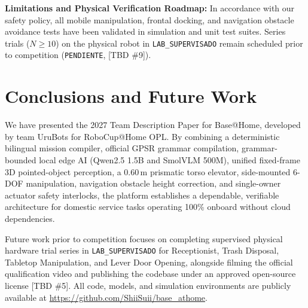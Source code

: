 \documentclass[runningheads,a4paper]{llncs}
\begin{document}
\textbf{Limitations and Physical Verification Roadmap:} In accordance with our safety policy, all mobile manipulation, frontal docking, and navigation obstacle avoidance tests have been validated in simulation and unit test suites. Series trials ($N \ge 10$) on the physical robot in \texttt{LAB\_SUPERVISADO} remain scheduled prior to competition (\texttt{PENDIENTE}, [TBD \#9]).

\section{Conclusions and Future Work}
\label{sec:conclusions}
We have presented the 2027 Team Description Paper for Base@Home, developed by team UruBots for RoboCup@Home OPL. By combining a deterministic bilingual mission compiler, official GPSR grammar compilation, grammar-bounded local edge AI (Qwen2.5 1.5B and SmolVLM 500M), unified fixed-frame 3D pointed-object perception, a $0.60\,\text{m}$ prismatic torso elevator, side-mounted 6-DOF manipulation, navigation obstacle height correction, and single-owner actuator safety interlocks, the platform establishes a dependable, verifiable architecture for domestic service tasks operating 100\% onboard without cloud dependencies.

Future work prior to competition focuses on completing supervised physical hardware trial series in \texttt{LAB\_SUPERVISADO} for Receptionist, Trash Disposal, Tabletop Manipulation, and Lever Door Opening, alongside filming the official qualification video and publishing the codebase under an approved open-source license [TBD \#5]. All code, models, and simulation environments are publicly available at \url{https://github.com/ShiiSuii/base_athome}.




\clearpage

\robospecs{}


\nocite{*}
\end{document}
